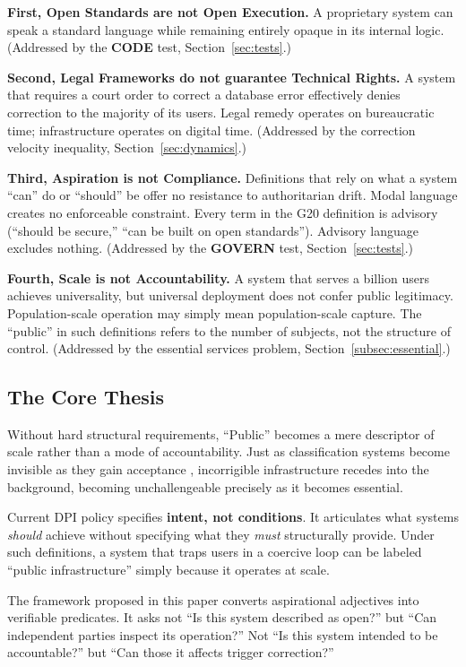 \documentclass{article}
\begin{document}
\textbf{First, Open Standards are not Open Execution.} A proprietary system can speak a standard language while remaining entirely opaque in its internal logic. (Addressed by the \textbf{CODE} test, Section~\ref{sec:tests}.)

\textbf{Second, Legal Frameworks do not guarantee Technical Rights.} A system that requires a court order to correct a database error effectively denies correction to the majority of its users. Legal remedy operates on bureaucratic time; infrastructure operates on digital time. (Addressed by the correction velocity inequality, Section~\ref{sec:dynamics}.)

\textbf{Third, Aspiration is not Compliance.} Definitions that rely on what a system ``can'' do or ``should'' be offer no resistance to authoritarian drift. Modal language creates no enforceable constraint. Every term in the G20 definition is advisory (``should be secure,'' ``can be built on open standards''). Advisory language excludes nothing. (Addressed by the \textbf{GOVERN} test, Section~\ref{sec:tests}.)

\textbf{Fourth, Scale is not Accountability.} A system that serves a billion users achieves universality, but universal deployment does not confer public legitimacy. Population-scale operation may simply mean population-scale capture. The ``public'' in such definitions refers to the number of subjects, not the structure of control. (Addressed by the essential services problem, Section~\ref{subsec:essential}.)

\subsection{The Core Thesis}

Without hard structural requirements, ``Public'' becomes a mere descriptor of scale rather than a mode of accountability. Just as classification systems become invisible as they gain acceptance \citep{bowker1999}, incorrigible infrastructure recedes into the background, becoming unchallengeable precisely as it becomes essential.

\begin{clarification}[title=The Definitional Problem]
Current DPI policy specifies \textbf{intent, not conditions}. It articulates what systems \textit{should} achieve without specifying what they \textit{must} structurally provide. Under such definitions, a system that traps users in a coercive loop can be labeled ``public infrastructure'' simply because it operates at scale.

The framework proposed in this paper converts aspirational adjectives into verifiable predicates. It asks not ``Is this system described as open?'' but ``Can independent parties inspect its operation?'' Not ``Is this system intended to be accountable?'' but ``Can those it affects trigger correction?''
\end{clarification}
\end{document}
